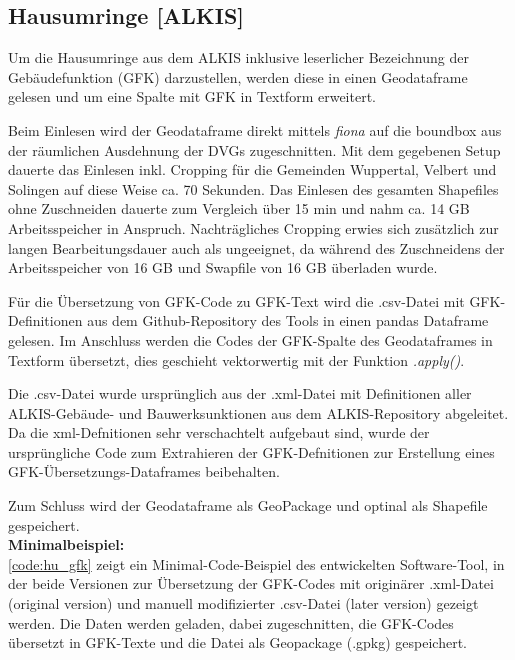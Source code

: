 		\subsection{Hausumringe [ALKIS]}
			Um die Hausumringe aus dem ALKIS inklusive leserlicher Bezeichnung der Gebäudefunktion (GFK) darzustellen, werden diese in einen Geodataframe gelesen und um eine Spalte mit GFK in Textform erweitert. 
			
			Beim Einlesen wird der Geodataframe direkt mittels \textit{fiona} auf die boundbox aus der räumlichen Ausdehnung der DVGs zugeschnitten. Mit dem gegebenen Setup dauerte das Einlesen inkl. Cropping für die Gemeinden Wuppertal, Velbert und Solingen auf diese Weise ca. 70 Sekunden. Das Einlesen des gesamten Shapefiles ohne Zuschneiden dauerte zum Vergleich über 15 min und nahm ca. 14 GB Arbeitsspeicher in Anspruch. Nachträgliches Cropping erwies sich zusätzlich zur langen Bearbeitungsdauer auch als ungeeignet, da während des Zuschneidens der Arbeitsspeicher von 16 GB und Swapfile von 16 GB überladen wurde. 
			
			Für die Übersetzung von GFK-Code zu GFK-Text wird die .csv-Datei mit GFK-Definitionen aus dem Github-Repository des Tools in einen pandas Dataframe gelesen. Im Anschluss werden die Codes der GFK-Spalte des Geodataframes in Textform übersetzt, dies geschieht vektorwertig mit der Funktion \textit{.apply()}. 
			
			Die .csv-Datei wurde ursprünglich aus der .xml-Datei mit Definitionen aller ALKIS-Gebäude- und Bauwerksunktionen aus dem ALKIS-Repository abgeleitet. Da die xml-Defnitionen sehr verschachtelt aufgebaut sind, wurde der ursprüngliche Code zum Extrahieren der GFK-Defnitionen zur Erstellung eines GFK-Übersetzungs-Dataframes beibehalten. 
			
			Zum Schluss wird der Geodataframe als GeoPackage und optinal als Shapefile gespeichert.\\
			
			\textbf{Minimalbeispiel:}\\
			\autoref{code:hu_gfk} zeigt ein Minimal-Code-Beispiel des entwickelten Software-Tool, in der beide Versionen zur Übersetzung der GFK-Codes mit originärer .xml-Datei (original version) und manuell modifizierter .csv-Datei (later version) gezeigt werden. Die Daten werden geladen, dabei zugeschnitten, die GFK-Codes übersetzt in GFK-Texte und die Datei als Geopackage (.gpkg) gespeichert. 
			

